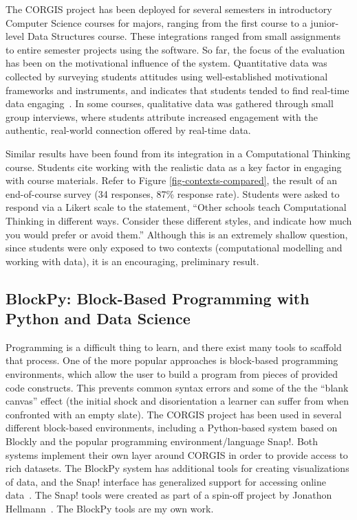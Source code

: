 The CORGIS project has been deployed for several semesters in introductory Computer Science courses for majors, ranging from the first course to a junior-level Data Structures course.
These integrations ranged from small assignments to entire semester projects using the software.
So far, the focus of the evaluation has been on the motivational influence of the system.
Quantitative data was collected by surveying students attitudes using well-established motivational frameworks and instruments, and indicates that students tended to find real-time data engaging~\cite{realtimeweb}.
In some courses, qualitative data was gathered through small group interviews, where students attribute increased engagement with the authentic, real-world connection offered by real-time data.

Similar results have been found from its integration in a Computational Thinking course. Students cite working with the realistic data as a key factor in engaging with course materials.
Refer to Figure \ref{fig-contexts-compared}, the result of an end-of-course survey (34 responses, 87\% response rate).
Students were asked to respond via a Likert scale to the statement, ``Other schools teach Computational Thinking in different ways. Consider these different styles, and indicate how much you would prefer or avoid them.''
Although this is an extremely shallow question, since students were only exposed to two contexts (computational modelling and working with data), it is an encouraging, preliminary result.

\subsection{BlockPy: Block-Based Programming with Python and Data Science}

Programming is a difficult thing to learn, and there exist many tools to scaffold that process.
One of the more popular approaches is block-based programming environments, which allow the user to build a program from pieces of provided code constructs.
This prevents common syntax errors and some of the the ``blank canvas'' effect (the initial shock and disorientation a learner can suffer from when confronted with an empty slate).
The CORGIS project has been used in several different block-based environments, including a Python-based system based on Blockly and the popular programming environment/language Snap!. 
Both systems implement their own layer around CORGIS in order to provide access to rich datasets.
The BlockPy system has additional tools for creating visualizations of data, and the Snap! interface has generalized support for accessing online data~\cite{bart-bab}.
The Snap! tools were created as part of a spin-off project by Jonathon Hellmann~\cite{hellmann2015datasnap}. The BlockPy tools are my own work.

